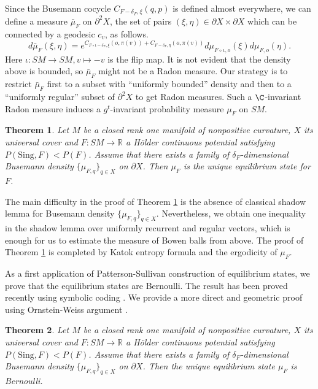 \documentclass[11pt]{amsart}
\newtheorem{thmm}{Theorem}\renewcommand{\thethmm}{\Alph{thmm}}
\theoremstyle{definition}
\def\p{{\partial}}
\def\pX{{\partial X}}
\def\RR{{\mathbb R}}
\def\d{\delta}   %
\begin{document}
Since the Busemann cocycle $C_{F-\d_F,\xi}(q,p)$ is defined almost everywhere, we can define a measure $\bar\mu_F$ on $\p^2X$, the set of pairs $(\xi,\eta)\in\pX\times \pX$ which can be connected by a geodesic $c_v$, as follows.
$$d \bar \mu_{F}(\xi,\eta) = e^{C_{F\circ \iota-\d_F,\xi}(o, \pi(v))+C_{F-\d_F,\eta}(o, \pi(v))}d\mu_{F\circ \iota,o}(\xi) d\mu_{F,o}(\eta).$$
Here $\iota: SM\to SM, v\mapsto -v$ is the flip map. It is not evident that the density above is bounded, so $\bar\mu_F$ might not be a Radon measure. Our strategy is to restrict $\bar\mu_F$ first to a subset with ``uniformly bounded'' density and then to a ``uniformly regular'' subset of $\p^2X$ to get Radon measures. Such a $\C$-invariant Radon measure induces a $g^t$-invariant probability measure $\mu_F$ on $SM$.
\begin{thmm}\label{es}
Let $M$ be a closed rank one manifold of nonpositive curvature, $X$ its universal cover and $F:SM\to \RR$ a H\"{o}lder continuous potential satisfying $P(\text{Sing},F)<P(F)$. Assume that there exists a family of $\d_F$-dimensional Busemann density $\{\mu_{F,q}\}_{q\in X}$ on $\pX$. Then $\mu_F$ is the unique equilibrium state for $F$.
\end{thmm}
The main difficulty in the proof of Theorem \ref{es} is the absence of classical shadow lemma for Busemann density $\{\mu_{F,q}\}_{q\in X}$. Nevertheless, we obtain one inequality in the shadow lemma over uniformly recurrent and regular vectors, which is enough for us to estimate the measure of Bowen balls from above. The proof of Theorem \ref{es} is completed by Katok entropy formula and the ergodicity of $\mu_F$.

As a first application of Patterson-Sullivan construction of equilibrium states, we prove that the equilibrium states are Bernoulli. The result has been proved recently using symbolic coding \cite[Corollary 1.3]{ALP}. We provide a more direct and geometric proof using Ornstein-Weiss argument \cite{OW}.
\begin{thmm}\label{bernoulli}
Let $M$ be a closed rank one manifold of nonpositive curvature, $X$ its universal cover and $F:SM\to \RR$ a H\"{o}lder continuous potential satisfying $P(\text{Sing},F)<P(F)$. Assume that there exists a family of $\d_F$-dimensional Busemann density $\{\mu_{F,q}\}_{q\in X}$ on $\pX$. Then the unique equilibrium state $\mu_F$ is Bernoulli.
\end{thmm}
\end{document}
